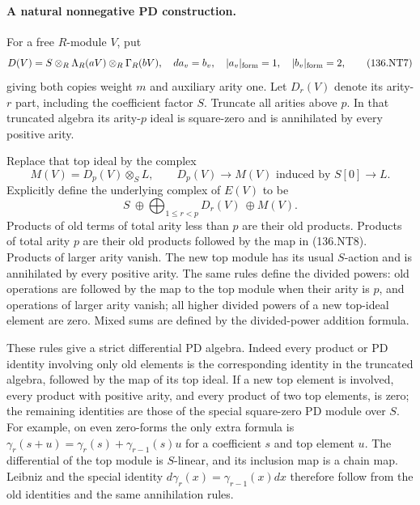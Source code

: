 \paragraph{A natural nonnegative PD construction.}
For a free \(R\)-module \(V\), put
\[
 D(V)=S\otimes_R\Lambda_R(aV)\otimes_R\Gamma_R(bV),
 \quad da_v=b_v,
 \quad |a_v|_{\rm form}=1,\quad |b_v|_{\rm form}=2,
                                                        \tag{136.NT7}
\]
giving both copies weight \(m\) and auxiliary arity one.
Let \(D_r(V)\) denote its arity-\(r\) part, including the
coefficient factor \(S\). Truncate all arities above \(p\).
In that truncated algebra its arity-\(p\) ideal is square-zero
and is annihilated by every positive arity.

Replace that top ideal by the complex
\[
       M(V)=D_p(V)\otimes_S L,
 \qquad D_p(V)\longrightarrow M(V)
                    \text{ induced by }S[0]\longrightarrow L.
                                                        \tag{136.NT8}
\]
Explicitly define the underlying complex of \(E(V)\) to be
\[
       S\ \oplus\!\bigoplus_{1\leq r<p}D_r(V)
                                  \ \oplus M(V).       \tag{136.NT9}
\]
Products of old terms of total arity less than \(p\) are their
old products. Products of total arity \(p\) are their old products
followed by the map in (136.NT8). Products of larger arity vanish.
The new top module has its usual \(S\)-action and is annihilated
by every positive arity. The same rules define the divided powers:
old operations are followed by the map to the top module when
their arity is \(p\), and operations of larger arity vanish;
all higher divided powers of a new top-ideal element are zero.
Mixed sums are defined by the divided-power addition formula.

These rules give a strict differential PD algebra.
Indeed every product or PD identity involving only old elements
is the corresponding identity in the truncated algebra, followed
by the map of its top ideal. If a new top element is involved,
every product with positive arity, and every product of two top
elements, is zero; the remaining identities are those of the
special square-zero PD module over \(S\). For example, on even
zero-forms the only extra formula is
\(\gamma_r(s+u)=\gamma_r(s)+\gamma_{r-1}(s)u\) for a
coefficient \(s\) and top element \(u\). The differential of
the top module is \(S\)-linear, and its inclusion map is a chain
map. Leibniz and the special identity
\(d\gamma_r(x)=\gamma_{r-1}(x)dx\) therefore follow from
the old identities and the same annihilation rules.

